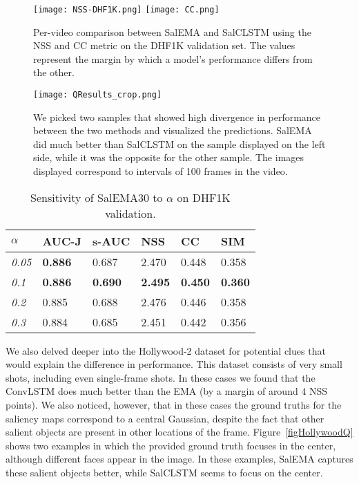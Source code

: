 \documentclass{bmvc2k}
\begin{document}
\begin{figure}[t]
\begin{center}
\texttt{[image: NSS-DHF1K.png]}
\texttt{[image: CC.png]}
\end{center}
\caption{Per-video comparison between SalEMA and SalCLSTM using the NSS and CC metric on the DHF1K validation set. The values represent the margin by which a model's performance differs from the other. } 
\label{NSS-comparison}
\end{figure}


\begin{figure}[t]
\begin{center}
\texttt{[image: QResults\_crop.png]}

\end{center}
\caption{We picked two samples that showed high divergence in performance between the two methods and visualized the predictions. SalEMA did much better than SalCLSTM on the sample displayed on the left side, while it was the opposite for the other sample. The images displayed correspond to intervals of 100 frames in the video.} 
\label{QResults}
\end{figure}

\begin{table}[t]
\begin{center}
\begin{tabularx}{\textwidth}{XXXXXl}
\toprule
\textbf{\textbf{$\alpha$}} & \textbf{AUC-J}  &\textbf{s-AUC} & \textbf{NSS} 	&  \textbf{CC}  & \textbf{SIM}\\
\midrule


\textit{0.05} & \textbf{0.886}	& 0.687	& 2.470	& 0.448	& 0.358\\
\textit{0.1} & \textbf{0.886}	& \textbf{0.690}	&	\textbf{2.495}	&	\textbf{0.450}	&	\textbf{0.360}\\
\textit{0.2} & 0.885	&	0.688	&	2.476	&	0.446	&	0.358\\
\textit{0.3} & 0.884	&	0.685	&	2.451	&	0.442	&	0.356\\


\bottomrule
\end{tabularx}
\end{center}
\caption{Sensitivity of SalEMA30 to $\alpha$ on DHF1K validation.} \label{tabAlpha}
\end{table}


We also delved deeper into the Hollywood-2 dataset for potential clues that would explain the difference in performance. This dataset consists of very small shots, including even single-frame shots. In these cases we found that the ConvLSTM does much better than the EMA (by a margin of around $4$ NSS points). We also noticed, however, that in these cases the ground truths for the saliency maps correspond to a central Gaussian, despite the fact that other salient objects are present in other locations of the frame.
Figure~\ref{figHollywoodQ} shows two examples in which the provided ground truth focuses in the center, although different faces appear in the image. In these examples, SalEMA captures these salient objects better, while SalCLSTM seems to focus on the center.
\end{document}
